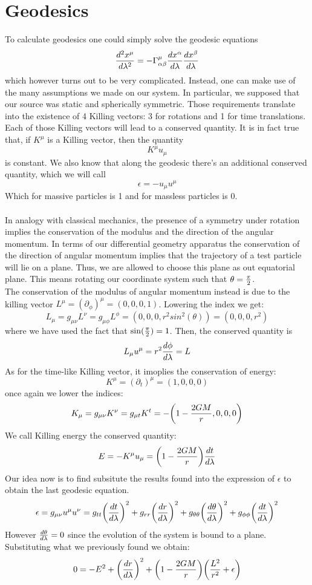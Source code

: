 \documentclass[]{article}
\theoremstyle{definition}
\theoremstyle{Theorem}
\theoremstyle{definition}
\theoremstyle{definition}
\theoremstyle{definition}
\begin{document}
\section{Geodesics}
To calculate geodesics one could simply solve the geodesic equations $${d^2x^\mu\over d\lambda^2}=-\Gamma_{\alpha\beta}^\mu{dx^\alpha\over d\lambda}{dx^\beta\over d\lambda}$$
which however turns out to be very complicated. Instead, one can make use of the many assumptions we made on our system. In particular, we supposed that our source was static and spherically symmetric. Those requirements translate into the existence of 4 Killing vectors: 3 for rotations and 1 for time translations. Each of those Killing vectors will lead to a conserved quantity. It is in fact true that, if $K^\mu$ is a Killing vector, then the quantity $$K^\mu u_\mu$$
is constant. We also know that along the geodesic there's an additional conserved quantity, which we will call
$$\epsilon=-u_\mu u^\mu$$
Which for massive particles is 1 and for massless particles is 0.\\
\\
In analogy with classical mechanics, the presence of a symmetry under rotation implies the conservation of the modulus and the direction of the angular momentum. In terms of our differential geometry apparatus the conservation of the direction of angular momentum implies that the trajectory of a test particle will lie on a plane. Thus, we are allowed to choose this plane as out equatorial plane. This means rotating our coordinate system such that $\theta={\pi\over2}$.\\
The conservation of the modulus of angular momentum instead is due to the killing vector $L^\mu=(\partial_\phi)^\mu=(0,0,0,1)$. Lowering the index we get:
$$L_\mu=g_{\mu\nu}L^\nu=g_{\mu\phi}L^\phi=(0,0,0,r^2sin^2(\theta))=(0,0,0,r^2)$$
where we have used the fact that $\sin({\pi\over2})=1$.
Then, the conserved quantity is $$L_\mu u^\mu=r^2{d\phi\over d\lambda}=L$$
As for the time-like Killing vector, it imoplies the conservation of energy: 
$$K^\mu=(\partial_t)^\mu=(1,0,0,0)$$
once again we lower the indices:
$$K_\mu=g_{\mu\nu}K^\nu=g_{\mu t}K^t=-\bigg(1-{2GM\over r},0,0,0\bigg)$$
We call Killing energy the conserved quantity:
$$E=-K^\mu u_\mu=\bigg(1-{2GM\over r}\bigg){dt\over d\lambda}$$
Our idea now is to find subsitute the results found into the expression of $\epsilon$ to obtain the last geodesic equation.
$$\epsilon=g_{\mu\nu}u^\mu u^\nu=g_{tt}\bigg({dt\over d\lambda}\bigg)^2+g_{rr}\bigg({dr\over d\lambda}\bigg)^2+g_{\theta\theta}\bigg({d\theta\over d\lambda}\bigg)^2+g_{\phi\phi}\bigg({dt\over d\lambda}\bigg)^2$$
However ${d\theta\over d\lambda}=0$ since the evolution of the system is bound to a plane. Substituting what we previously found we obtain:
$$0=-E^2+\bigg({dr\over d\lambda}\bigg)^2+\bigg(1-{2GM\over r}\bigg)\bigg({L^2\over r^2}+\epsilon\bigg)$$
\end{document}
